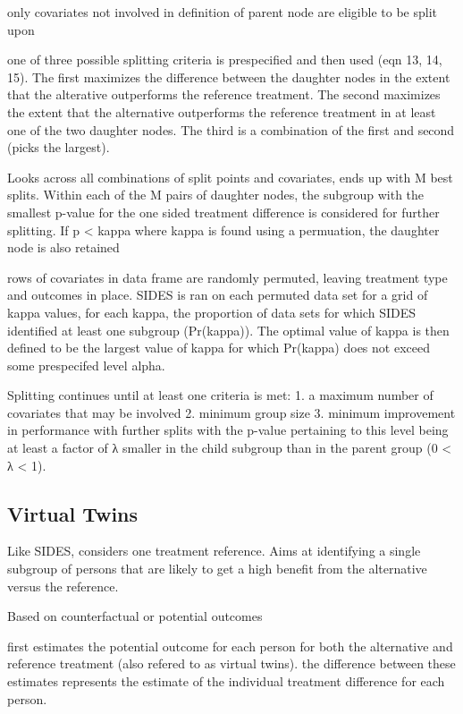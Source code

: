 \documentclass[10pt]{article}
\begin{document}
only covariates not involved in definition of parent node are eligible to be split upon

one of three possible splitting criteria is prespecified and then used (eqn 13, 14, 15). The first maximizes the difference between the daughter nodes in the extent that the alterative outperforms the reference treatment. The second maximizes the extent that the alternative outperforms the reference treatment in at least one of the two daughter nodes. The third is a combination of the first and second (picks the largest).

Looks across all combinations of split points and covariates, ends up with M best splits. Within each of the M pairs of daughter nodes, the subgroup with the smallest p-value for the one sided treatment difference is considered for further splitting. If p < kappa where kappa is found using a permuation, the daughter node is also retained

rows of covariates in data frame are randomly permuted, leaving treatment type and outcomes in place. SIDES is ran on each permuted data set for a grid of kappa values, for each kappa, the proportion of data sets for which SIDES identified at least one subgroup (Pr(kappa)). The optimal value of kappa is then defined to be the largest value of kappa for which Pr(kappa) does not exceed some prespecifed level alpha.

Splitting continues until at least one criteria is met:
1. a maximum number of covariates that may be involved
2. minimum group size
3. minimum improvement in performance with further splits  with the p-value pertaining to this level being at least a factor of λ smaller in the child subgroup than in the parent group (0 < λ < 1).


\subsection{Virtual Twins} %
\label{sub:virtual_twins}

Like SIDES, considers one treatment reference. Aims at identifying a single subgroup of persons that are likely to get a high benefit from the alternative versus the reference.

Based on counterfactual or potential outcomes

first estimates the potential outcome for each person for both the alternative and reference treatment (also refered to as virtual twins). the difference between these estimates represents the estimate of the individual treatment difference for each person.
\end{document}
